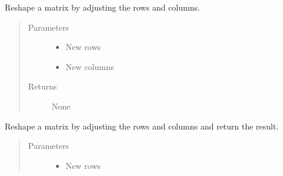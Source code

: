\documentclass[letterpaper,10pt,english]{sphinxmanual}
\begin{document}
\begin{fulllineitems}
\begin{fulllineitems}
\end{fulllineitems}


\begin{fulllineitems}
\label{\detokenize{libpymath.matrix:libpymath.matrix.matrix.Matrix.mean}}
\end{fulllineitems}


\begin{fulllineitems}
\label{\detokenize{libpymath.matrix:libpymath.matrix.matrix.Matrix.reshape}}
Reshape a matrix by adjusting the rows and columns.
\begin{quote}\begin{description}
\item[{Parameters}] \leavevmode\begin{itemize}
\item {} 
 \textendash{} New rows

\item {} 
 \textendash{} New columns

\end{itemize}

\item[{Returns}] \leavevmode
None

\end{description}\end{quote}

\end{fulllineitems}


\begin{fulllineitems}
\label{\detokenize{libpymath.matrix:libpymath.matrix.matrix.Matrix.reshaped}}
Reshape a matrix by adjusting the rows and columns and return the result.
\begin{quote}\begin{description}
\item[{Parameters}] \leavevmode\begin{itemize}
\item {} 
 \textendash{} New rows


\end{itemize}
\end{description}
\end{quote}
\end{fulllineitems}
\end{fulllineitems}
\end{document}
